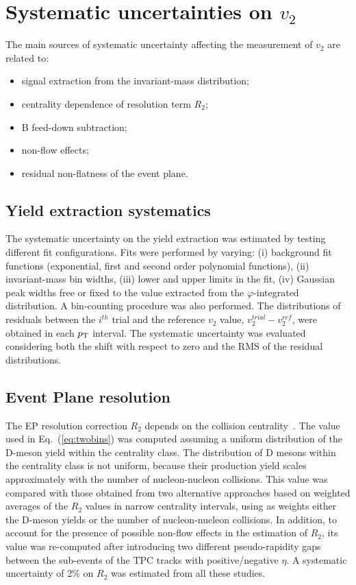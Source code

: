 \section{Systematic uncertainties on $v_2$}
\label{sec:systsectionV2}
The main sources of systematic uncertainty affecting the measurement of 
$v_2$ are related to: 
\begin{itemize}
\item signal extraction from the invariant-mass
distribution;
\item centrality dependence of resolution term $R_2$;
\item B feed-down subtraction;
\item non-flow effects;
\item residual non-flatness of the event plane.
\end{itemize}

\subsection{Yield extraction systematics}
\label{sec:rawYv2}
The systematic uncertainty on the yield extraction was 
estimated by testing different fit configurations.
Fits were performed by varying: (i) background fit functions
(exponential, first and second order polynomial functions), (ii) invariant-mass bin
widths, (iii) lower and upper limits in the fit, (iv) Gaussian peak widths free or fixed to the value
extracted from the $\varphi$-integrated distribution. A bin-counting procedure
was also performed. The distributions of
residuals between the $i^{th}$ trial and the reference $v_2$ value, 
$v_2^{trial}-v_2^{ref}$, were obtained in each $p_{\rm T}$ interval. 
The systematic uncertainty was evaluated
considering both the shift with respect to zero and the RMS of the residual
distributions. 

\subsection{Event Plane resolution}
\label{sec:EPreso}
The EP resolution correction $R_2$ depends on the 
collision centrality~\cite{Abelev:2014ipa}.
The value used in Eq.~(\ref{eq:twobins}) was computed
 assuming a uniform distribution of the D-meson yield within 
 the centrality class. The distribution of D mesons within the 
 centrality class is not uniform, because their production yield
scales approximately with the number of nucleon-nucleon collisions.
This value was compared with those obtained from two alternative approaches
based on weighted averages of the $R_2$ values in narrow centrality 
intervals, using as weights either the D-meson yields or the number of 
nucleon-nucleon collisions. 
In addition, to account for the presence of possible non-flow effects in the estimation of $R_2$, 
its value was re-computed after introducing two different pseudo-rapidity gaps between the
sub-events of the TPC tracks with positive/negative $\eta$. 
A systematic uncertainty of 2\% on $R_2$ was estimated from 
all these studies.

